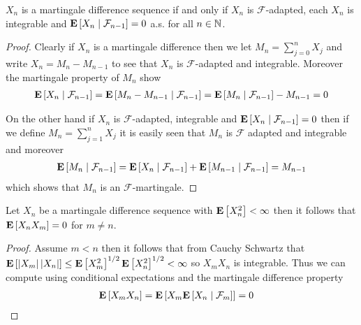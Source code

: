 \begin{prop}\label{MartingaleDifferenceSequence}$X_n$ is a martingale difference sequence if and only if
  $X_n$ is $\mathcal{F}$-adapted, each $X_n$ is integrable and 
  $\cexpectationlong{\mathcal{F}_{n-1}}{X_n} = 0$ a.s. for all $n \in \naturals$.
\end{prop}
\begin{proof}
Clearly if $X_n$ is a martingale difference then we let $M_n =
\sum_{j=0}^n X_j$ and write $X_n = M_n - M_{n-1}$ to see that $X_n$ is
$\mathcal{F}$-adapted and integrable.  Moreover the martingale
property of $M_n$ show
\begin{align*}
\cexpectationlong{\mathcal{F}_{n-1}}{X_n} =
  \cexpectationlong{\mathcal{F}_{n-1}}{M_n - M_{n-1}} =
  \cexpectationlong{\mathcal{F}_{n-1}}{M_n }- M_{n-1} = 0
\end{align*}

On the other hand if $X_n$ is $\mathcal{F}$-adapted, integrable and
$\cexpectationlong{\mathcal{F}_{n-1}}{X_n} = 0$ then if we define $M_n
= \sum_{j=1}^n X_j$ it is easily seen that $M_n$ is $\mathcal{F}$
adapted and integrable and moreover
\begin{align*}
\cexpectationlong{\mathcal{F}_{n-1}}{M_n}  =
  \cexpectationlong{\mathcal{F}_{n-1}}{X_n}+
  \cexpectationlong{\mathcal{F}_{n-1}}{M_{n-1}}  = M_{n-1}
\end{align*}
which shows that $M_n$ is an $\mathcal{F}$-martingale.
\end{proof}

\begin{prop}\label{SquareIntegrableMartingaleDifferenceWhiteNoise}Let $X_n$ be a martingale difference sequence with
  $\expectation{X_n^2} < \infty$ then it follows that
  $\expectation{X_n X_m} = 0$ for $m \neq n$.
\end{prop}
\begin{proof}
Assume $m < n$ then it follows that from Cauchy Schwartz that
$\expectation{\abs{X_m} \abs{X_n}} \leq \expectation{X^2_m}^{1/2}
\expectation{X^2_n}^{1/2} < \infty$ so $X_m X_n$ is integrable.  Thus
we can compute using conditional expectations and the martingale
difference property
\begin{align}\label{MartingaleDifferenceLindebergCondition}
\expectation{X_m X_n} &= \expectation{X_m
                        \cexpectationlong{\mathcal{F}_m}{X_n} } = 0
\end{align}
\end{proof}

